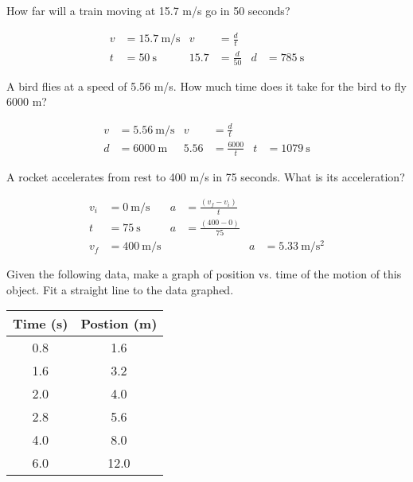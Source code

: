 \documentclass[10pt]{exam}
\newcommand{\ansblank}{
  \ifprintanswers
  \else
    \ku
  \fi
  \vs
}
\begin{document}
\begin{questions}
  
  
        
  \question
  	How far will a train moving at 15.7 m/s go in 50 seconds? 
    \begin{solution}
      \begin{align*}
        v &= \SI{15.7}{\meter\per\second}
                            & v &= \frac{d}{t} \\
        t &= \SI{50}{\second}
                            & 15.7 &= \frac{d}{50} &
                              d &= \SI{785}{\second}
      \end{align*}
    \end{solution}
    \ansblank
  
  \question
    A bird flies at a speed of 5.56 m/s.  How much time does it take for the bird to fly 6000 m?
    \begin{solution}
      \begin{align*}
        v &= \SI{5.56}{\meter\per\second}
                            & v &= \frac{d}{t} \\
                            d &= \SI{6000}{\meter}
                            & 5.56 &= \frac{6000}{t} &
                            t &= \SI{1079}{\second}
      \end{align*}
    \end{solution}
    \ansblank 
  
  \question
    A rocket accelerates from rest to 400 m/s in 75 seconds.  What is its acceleration?
    \begin{solution}
      \begin{align*}
        v_i &= \SI{0}{\meter\per\second}  & 
                  a &= \frac{\left(v_f-v_i\right)}{t} \\
        t &= \SI{75}{\second} &
                  a &= \frac{\left(400-0\right)}{75}  \\
        v_f &= \SI{400}{\meter\per\second} &&&
                    a &= \SI{5.33}{\meter\per\second^2}
      \end{align*}
    \end{solution}
    \ansblank
  
  \pagebreak

  \question
    Given the following data, make a graph of position  vs. time of the motion of this object.  Fit a straight line to the data graphed.  

      \begin{center}
        \begin{tabular}{cc}
          \hline
          Time (s) & Postion (m) \\
          \hline
          0.8      &	1.6        \\
          1.6      &	3.2        \\
          2.0      &  4.0        \\
          2.8      &	5.6        \\
          4.0      &	8.0        \\
          6.0      &	12.0       \\
          \hline\hline
        \end{tabular}
      \end{center}
  

\end{questions}
\end{document}
